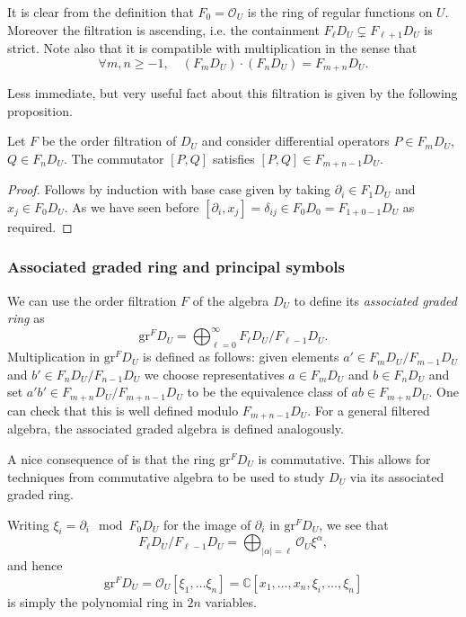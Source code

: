 It is clear from the definition that \(F_0=\mathscr{O}_U\) is the ring of
regular functions on $U$. Moreover the filtration is ascending, i.e. the
containment \(F_\ell D_U \subsetneq F_{\ell+1}D_U\) is strict. Note also that it
is compatible with multiplication in the sense that
\begin{equation*}
    \forall m,n\geq -1, \quad (F_{m}D_U)\cdot (F_n D_U) = F_{m+n} D_U .
\end{equation*}

Less immediate, but very useful fact about this filtration is given by the following proposition.

\begin{proposition}\label{prop:commutators}
    Let $F$ be the order filtration of $D_U$ and consider differential operators
    $P\in F_m D_U$, $Q\in F_n D_U$. The commutator $[P,Q]$ satisfies $[P,Q]\in
    F_{m+n-1}D_U.$ 
    \begin{proof} 
        Follows by induction with base case given by taking $\partial_i\in F_1
        D_U$ and $x_j\in F_0 D_U$. As we have seen before $[\partial_i,
        x_j]=\delta_{ij}\in F_0 D_0 = F_{1+0-1}D_U$ as required.
    \end{proof}
\end{proposition}

\subsubsection{Associated graded ring and principal symbols}
We can use the order filtration $F$ of the algebra $D_U$ to define its
\emph{associated graded ring} as 
\begin{equation*}
    \text{gr}^FD_U=\bigoplus_{\ell=0}^\infty F_\ell D_U / F_{\ell-1} D_U.
\end{equation*}
Multiplication in $\text{gr}^FD_U$ is defined as follows: given elements $a' \in
F_m D_U / F_{m-1} D_U$ and $b' \in F_n D_U / F_{n-1} D_U$ we choose
representatives $a\in F_m D_U$ and $b\in F_n D_U$ and set $a'b'\in F_{m+n} D_U/
F_{m+n-1} D_U$ to be the equivalence class of $ab \in F_{m+n} D_U$. One can
check that this is well defined modulo $F_{m+n-1} D_U$. For a general filtered
algebra, the associated graded algebra is defined analogously.

A nice consequence of  is that the ring
\(\text{gr}^FD_U\) is commutative. This allows for techniques from commutative
algebra to be used to study $D_U$ via its associated graded ring.

Writing \(\xi_i = \partial_i \mod F_0 D_U \) for the image of \(\partial_i\) in
\(\text{gr}^FD_U\), we see that 
\begin{equation*}
    F_\ell D_U / F_{\ell-1} D_U = \bigoplus_{|\alpha|=\ell}\mathscr{O}_U \xi^{\alpha},
\end{equation*} 
and hence
\begin{equation*}
    \text{gr}^F D_U = \mathscr{O}_U [\xi_1,\dots\xi_n]=\mathbb{C}[x_1,\dots,x_n,
    \xi_i,\dots,\xi_n]
\end{equation*}  
is simply the polynomial ring in $2n$ variables.

